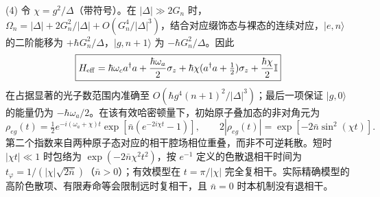 (4) 令 \(\chi=g^2/\Delta\)（带符号）。在 \(|\Delta|\gg2G_n\) 时，
\(\Omega_n=|\Delta|+2G_n^2/|\Delta|+O(G_n^4/|\Delta|^3)\)，结合对应缀饰态与裸态的连续对应，\(|e,n\rangle\) 的二阶能移为 \(+\hbar G_n^2/\Delta\)，\(|g,n+1\rangle\) 为 \(-\hbar G_n^2/\Delta\)。因此
\[
\boxed{H_{\rm eff}=\hbar\omega_ca^\dagger a+
\frac{\hbar\omega_a}{2}\sigma_z+
\hbar\chi(a^\dagger a+\tfrac12)\sigma_z+
\frac{\hbar\chi}{2}\mathbb I}
\]
在占据显著的光子数范围内准确至 \(O(\hbar g^4(n+1)^2/|\Delta|^3)\)；最后一项保证 \(|g,0\rangle\) 的能量仍为 \(-\hbar\omega_a/2\)。在该有效哈密顿量下，初始原子叠加态的非对角元为
\[
\boxed{\rho_{eg}(t)=\tfrac12e^{-i(\omega_a+\chi)t}
\exp\!\left[\bar n(e^{-2i\chi t}-1)\right]},\qquad
\boxed{2|\rho_{eg}(t)|=\exp[-2\bar n\sin^2(\chi t)]}.
\]
第二个指数来自两种原子态对应的相干腔场相位重叠，而非不可逆耗散。短时 \(|\chi t|\ll1\) 时包络为 \(\exp(-2\bar n\chi^2t^2)\)，按 \(e^{-1}\) 定义的色散退相干时间为 \(t_\varphi=1/(|\chi|\sqrt{2\bar n})\)（\(\bar n>0\)）；有效模型在 \(t=\pi/|\chi|\) 完全复相干。实际精确模型的高阶色散项、有限寿命等会限制远时复相干，且 \(\bar n=0\) 时本机制没有退相干。
